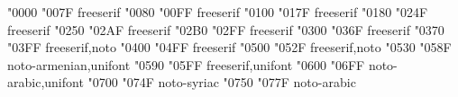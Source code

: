 \documentclass{article}
\begin{document}
                    {  "0000} {  "007F} {freeserif}
             {  "0080} {  "00FF} {freeserif}
                               {  "0100} {  "017F} {freeserif}
                               {  "0180} {  "024F} {freeserif}
                                 {  "0250} {  "02AF} {freeserif}
                       {  "02B0} {  "02FF} {freeserif}
                    {  "0300} {  "036F} {freeserif}
                               {  "0370} {  "03FF} {freeserif,noto}
                                       {  "0400} {  "04FF} {freeserif}
                            {  "0500} {  "052F} {freeserif,noto}
                                       {  "0530} {  "058F} {noto-armenian,unifont}
                                         {  "0590} {  "05FF} {freeserif,unifont}
                                         {  "0600} {  "06FF} {noto-arabic,unifont}
                                         {  "0700} {  "074F} {noto-syriac}
                              {  "0750} {  "077F} {noto-arabic}
\end{document}
